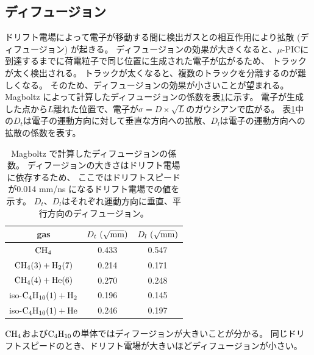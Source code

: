 \subsection{ディフュージョン}
ドリフト電場によって電子が移動する間に検出ガスとの相互作用により拡散 (ディフュージョン) が起きる。
ディフュージョンの効果が大きくなると、$\mu$-PICに到達するまでに荷電粒子で同じ位置に生成された電子が広がるため、
トラックが太く検出される。
トラックが太くなると、複数のトラックを分離するのが難しくなる。
そのため、ディフュージョンの効果が小さいことが望まれる。
Magboltz によって計算したディフュージョンの係数を表\ref{tab::diffusion}に示す。
電子が生成した点から$L$離れた位置で、電子が$\sigma = D\times\sqrt{L}$のガウシアンで広がる。
表\ref{tab::diffusion}中の$D_{t}$は電子の運動方向に対して垂直な方向への拡散、$D_{l}$は電子の運動方向への拡散の係数を表す。
\begin{table}
  \centering
  \caption[Magboltz で計算したディフュージョンの係数。]
          {Magboltz で計算したディフュージョンの係数。
            ディフージョンの大きさはドリフト電場に依存するため、
            ここではドリフトスピードが0.014 mm/ns になるドリフト電場での値を示す。
          $D_{t}$、$D_{l}$はそれぞれ運動方向に垂直、平行方向のディフュージョン。}
  \label{tab::diffusion}
  \begin{tabular}{ccc}
    \toprule
    gas & $D_{t}~(\sqrt{\rm mm})$ & $D_{l}~(\sqrt{\rm mm})$ \\
    \midrule
    ${\rm CH_{4}}$ & 0.433 & 0.547\\
    ${\rm CH_{4} (3) + H_{2} (7)}$ & 0.214 & 0.171\\
    ${\rm CH_{4} (4) + He (6)}$ & 0.270  & 0.248 \\
    iso-${\rm C_{4}H_{10} (1) + H_{2}}$ & 0.196 & 0.145 \\
    iso-${\rm C_{4}H_{10} (1) + He}$ & 0.246 & 0.197 \\
    \bottomrule
  \end{tabular}
\end{table}
${\rm CH_{4}}$および${\rm C_{4}H_{10}}$の単体ではディフージョンが大きいことが分かる。
同じドリフトスピードのとき、ドリフト電場が大きいほどディフュージョンが小さい。


